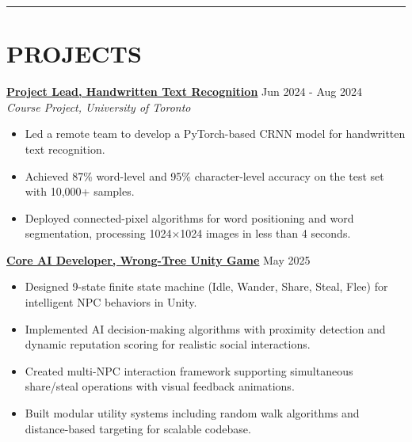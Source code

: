 \documentclass[letterpaper,10pt]{article}
\begin{document}
\noindent\rule{\linewidth}{1pt}

\section*{\textbf{PROJECTS}}

\noindent\href{https://github.com/Ken-2511/HandwritingRecognition}{\uline{
\textbf{Project Lead, Handwritten Text Recognition}}} \hfill Jun 2024 - Aug 2024\\
\textit{Course Project, University of Toronto}
\begin{itemize}[leftmargin=0.2in]
    \item Led a remote team to develop a PyTorch-based CRNN model for handwritten text recognition.
    \item Achieved 87\% word-level and 95\% character-level accuracy on the test set with 10,000+ samples.
    \item Deployed connected-pixel algorithms for word positioning and word segmentation, processing 1024$\times$1024 images in less than 4 seconds.
\end{itemize}

\vspace{0.3cm}
\noindent\href{https://github.com/XiuShw/Wrong-Tree}{\uline{
\textbf{Core AI Developer, Wrong-Tree Unity Game}}} \hfill May 2025
\begin{itemize}[leftmargin=0.2in]
    \item Designed 9-state finite state machine (Idle, Wander, Share, Steal, Flee) for intelligent NPC behaviors in Unity.
    \item Implemented AI decision-making algorithms with proximity detection and dynamic reputation scoring for realistic social interactions.
    \item Created multi-NPC interaction framework supporting simultaneous share/steal operations with visual feedback animations.
    \item Built modular utility systems including random walk algorithms and distance-based targeting for scalable codebase.
\end{itemize}
\end{document}
